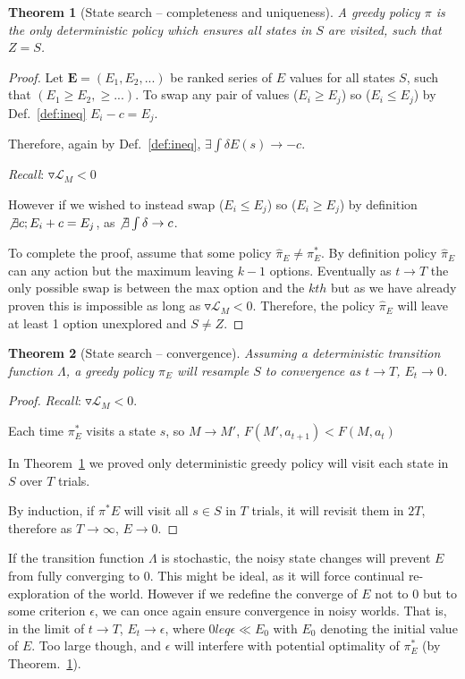 \documentclass[9pt,twocolumn,twoside]{pnas-new}
\newtheorem{theorem}{Theorem}
\begin{document}
\begin{theorem}[State search -- completeness and uniqueness] \label{theorem:Z}
A greedy policy $\pi$ is the only deterministic policy which ensures all states in $S$ are visited, such that $Z = S$.
\end{theorem}
\begin{proof}    
    Let $\mathbf{E} = (E_1, E_2, ...)$ be ranked series of $E$ values for all states $S$, such that $(E_1 \geq E_2, \geq ...)$. To swap any pair of values ($E_i \geq E_j$) so ($E_i \leq E_j$) by Def.~\ref{def:ineq} $E_i - c = E_j$.  

    Therefore, again by Def.~\ref{def:ineq}, $\exists \int \delta E(s) \rightarrow -c$. 

    \textit{Recall}: $\triangledown \mathcal{L}_M < 0$

    However if we wished to instead swap ($E_i \leq E_j$) so ($E_i \geq E_j$) by definition $\not \exists c; E_i + c = E_j$, as $\not \exists \int \delta \rightarrow c$. 

    To complete the proof, assume that some policy $\hat \pi_E \neq \pi^*_E$. By definition policy $\hat \pi_E$ can any action but the maximum leaving $k-1$ options. Eventually as $t \rightarrow T$ the only possible swap is between the max option and the $kth$ but as we have already proven this is impossible as long as $\triangledown \mathcal{L}_M < 0$. Therefore, the policy $\hat \pi_E$ will leave at least 1 option unexplored and $S \neq Z$.
\end{proof}

\begin{theorem}[State search -- convergence] \label{theorem:convergence}
    Assuming a deterministic transition function $\Lambda$, a greedy policy $\pi_E$ will resample $S$ to convergence as $t \rightarrow T$, $E_t \rightarrow 0$.
\end{theorem}
\begin{proof}
    \textit{Recall}: $\triangledown \mathcal{L}_M < 0$. 

    Each time $\pi^*_E$ visits a state $s$, so $M \rightarrow M'$, $F(M', a_{t+1}) < F(M, a_t)$

    In Theorem~\ref{theorem:Z} we proved only deterministic greedy policy will visit each state in $S$ over $T$ trials.
    
    By induction, if $\pi^*E$ will visit all $s \in S$ in $T$ trials, it will revisit them in $2T$, therefore as $T \rightarrow \infty$, $E \rightarrow 0$. 
\end{proof}

If the transition function $\Lambda$ is stochastic, the noisy state changes will prevent $E$ from fully converging to 0. This might be ideal, as it will force continual re-exploration of the world. However if we redefine the converge of $E$ not to 0 but to some criterion $\epsilon$, we can once again ensure convergence in noisy worlds. That is, in the limit of $t \rightarrow T$, $E_t \rightarrow \epsilon$, where $0 leq \epsilon \ll E_0$ with $E_0$ denoting the initial value of $E$. Too large though, and $\epsilon$ will interfere with potential optimality of $\pi^*_E$ (by Theorem.~\ref{theorem:Z}). 


\twocolumngrid
\end{document}
